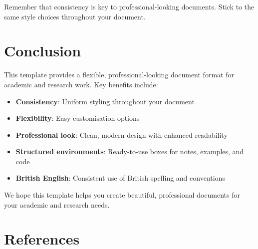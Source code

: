 \documentclass[a4paper,11pt]{article}
\begin{document}
\begin{notetbox}
    Remember that consistency is key to professional-looking documents. Stick to the same style choices throughout your document.
\end{notetbox}

\section{Conclusion}
This template provides a flexible, professional-looking document format for academic and research work. Key benefits include:

\begin{itemize}
    \item \textbf{Consistency}: Uniform styling throughout your document
    \item \textbf{Flexibility}: Easy customisation options
    \item \textbf{Professional look}: Clean, modern design with enhanced readability
    \item \textbf{Structured environments}: Ready-to-use boxes for notes, examples, and code
    \item \textbf{British English}: Consistent use of British spelling and conventions
\end{itemize}

We hope this template helps you create beautiful, professional documents for your academic and research needs.

\section{References}
\printbibliography[heading=none]
\end{document}
